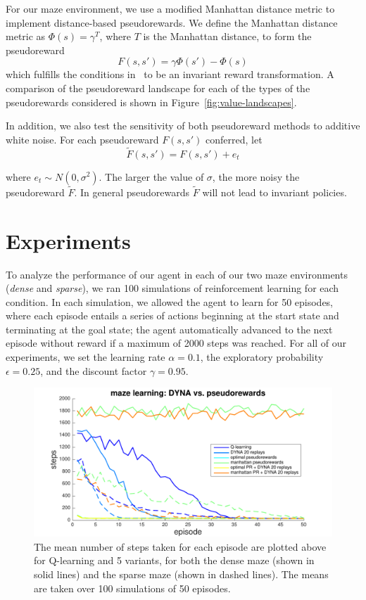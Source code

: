 \documentclass[notitlepage]{article}
\begin{document}
For our maze environment, we use a modified Manhattan distance metric to implement distance-based pseudorewards. We define the Manhattan distance metric as $\Phi(s) = \gamma^T$, where $T$ is the Manhattan distance, to form the pseudoreward
\begin{equation}
F(s, s') = \gamma \Phi(s') - \Phi(s)
\end{equation} 
which fulfills the conditions in~\cite{ng1999policy} to be an invariant reward transformation. A comparison of the pseudoreward landscape for each of the types of the pseudorewards considered is shown in Figure~\ref{fig:value-landscapes}.

In addition, we also test the sensitivity of both pseudoreward methods to additive white noise. For each pseudoreward $F(s, s')$ conferred, let
\begin{equation}
\tilde{F}(s, s') = F(s, s') + e_t
\end{equation} 

\noindent where $e_t \sim N(0, \sigma^2)$. The larger the value of $\sigma$, the more noisy the pseudoreward $\tilde{F}$. In general pseudorewards $\tilde{F}$ will not lead to invariant policies.

\section*{Experiments}

To analyze the performance of our agent in each of our two maze environments (\textit{dense} and \textit{sparse}), we ran 100 simulations of reinforcement learning for each condition. In each simulation, we allowed the agent to learn for 50 episodes, where each episode entails a series of actions beginning at the start state and terminating at the goal state; the agent automatically advanced to the next episode without reward if a maximum of 2000 steps was reached. For all of our experiments, we set the learning rate $\alpha = 0.1$, the exploratory probability $\epsilon = 0.25$, and the discount factor $\gamma = 0.95$. 

\begin{figure}[ht]
\includegraphics[width=\textwidth]{modelCompareNoNoise}
\caption{The mean number of steps taken for each episode are plotted above for Q-learning and 5 variants, for both the dense maze (shown in solid lines) and the sparse maze (shown in dashed lines). The means are taken over 100 simulations of 50 episodes.}
\label{fig:model-compare}
\end{figure}
\end{document}

